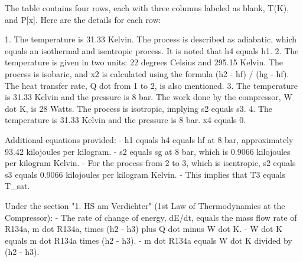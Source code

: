 The table contains four rows, each with three columns labeled as blank, T(K), and P[x]. Here are the details for each row:

1. The temperature is 31.33 Kelvin. The process is described as adiabatic, which equals an isothermal and isentropic process. It is noted that h4 equals h1.
2. The temperature is given in two units: 22 degrees Celsius and 295.15 Kelvin. The process is isobaric, and x2 is calculated using the formula (h2 - hf) / (hg - hf). The heat transfer rate, Q dot from 1 to 2, is also mentioned.
3. The temperature is 31.33 Kelvin and the pressure is 8 bar. The work done by the compressor, W dot K, is 28 Watts. The process is isotropic, implying s2 equals s3.
4. The temperature is 31.33 Kelvin and the pressure is 8 bar. x4 equals 0.

Additional equations provided:
- h1 equals h4 equals hf at 8 bar, approximately 93.42 kilojoules per kilogram.
- s2 equals sg at 8 bar, which is 0.9066 kilojoules per kilogram Kelvin.
- For the process from 2 to 3, which is isentropic, s2 equals s3 equals 0.9066 kilojoules per kilogram Kelvin.
- This implies that T3 equals T_sat.

Under the section "1. HS am Verdichter" (1st Law of Thermodynamics at the Compressor):
- The rate of change of energy, dE/dt, equals the mass flow rate of R134a, m dot R134a, times (h2 - h3) plus Q dot minus W dot K.
- W dot K equals m dot R134a times (h2 - h3).
- m dot R134a equals W dot K divided by (h2 - h3).